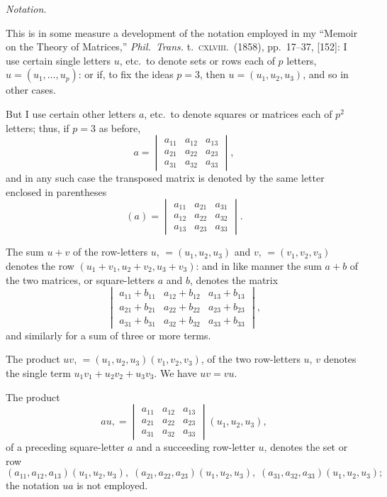 \documentclass[11pt,a4paper]{article}
\begin{document}
\bigskip

\begin{center}
\textit{Notation.}
\end{center}

\noindent
This is in some measure a development of the notation employed in my
``Memoir on the Theory of Matrices,'' \emph{Phil.\ Trans.} t.\ \textsc{cxlviii}.\
(1858), pp.\ 17--37, [152]: I use certain single letters $u$, etc.\ to denote
sets or rows each of $p$ letters, $u = (u_{1}, \ldots, u_{p})$: or if, to fix
the ideas $p = 3$, then $u = (u_{1}, u_{2}, u_{3})$, and so in other cases.

But I use certain other letters $a$, etc.\ to denote squares or matrices each
of $p^{2}$ letters; thus, if $p = 3$ as before,
\[
  a = \begin{vmatrix}
   a_{11} & a_{12} & a_{13} \\
   a_{21} & a_{22} & a_{23} \\
   a_{31} & a_{32} & a_{33}
  \end{vmatrix},
\]
and in any such case the transposed matrix is denoted by the same letter
enclosed in parentheses
\[
  (a) = \begin{vmatrix}
   a_{11} & a_{21} & a_{31} \\
   a_{12} & a_{22} & a_{32} \\
   a_{13} & a_{23} & a_{33}
  \end{vmatrix}.
\]

The sum $u + v$ of the row-letters $u$, $= (u_{1}, u_{2}, u_{3})$ and $v$,
$= (v_{1}, v_{2}, v_{3})$ denotes the row
$(u_{1} + v_{1}, u_{2} + v_{2}, u_{3} + v_{3})$: and in like manner the sum
$a + b$ of the two matrices, or square-letters $a$ and $b$, denotes the
matrix
\[
  \begin{vmatrix}
   a_{11} + b_{11} & a_{12} + b_{12} & a_{13} + b_{13} \\
   a_{21} + b_{21} & a_{22} + b_{22} & a_{23} + b_{23} \\
   a_{31} + b_{31} & a_{32} + b_{32} & a_{33} + b_{33}
  \end{vmatrix},
\]
and similarly for a sum of three or more terms.

The product $uv$, $= (u_{1}, u_{2}, u_{3})(v_{1}, v_{2}, v_{3})$, of the two
row-letters $u$, $v$ denotes the single term
$u_{1}v_{1} + u_{2}v_{2} + u_{3}v_{3}$.  We have $uv = vu$.

The product
\[
  au, = \begin{vmatrix}
   a_{11} & a_{12} & a_{13} \\
   a_{21} & a_{22} & a_{23} \\
   a_{31} & a_{32} & a_{33}
  \end{vmatrix} (u_{1}, u_{2}, u_{3}),
\]
of a preceding square-letter $a$ and a succeeding row-letter $u$, denotes
the set or row
\[
  (a_{11}, a_{12}, a_{13})(u_{1}, u_{2}, u_{3}),\;
  (a_{21}, a_{22}, a_{23})(u_{1}, u_{2}, u_{3}),\;
  (a_{31}, a_{32}, a_{33})(u_{1}, u_{2}, u_{3});
\]
the notation $ua$ is not employed.
\end{document}
